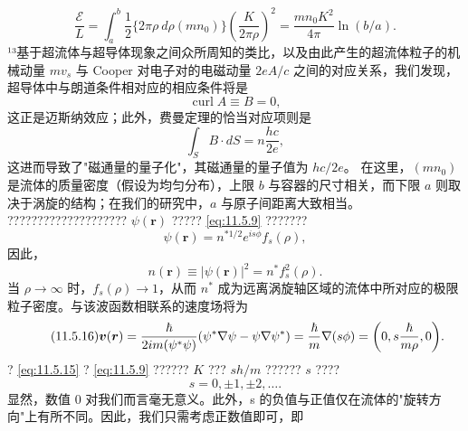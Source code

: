 \begin{equation}\tag{11.5.11}\label{eq:11.5.11}
\frac { \mathcal { E } } { L } = \int _ { a } ^{b} \frac { 1 } { 2 } \{ 2 \pi \rho \ d \rho ( m n _ { 0 } ) \} \left( \frac { K } { 2 \pi \rho } \right) ^{2} = \frac { m n _ { 0 } K ^{2} } { 4 \pi } \ln ( b / a ) .
\end{equation}
¹³基于超流体与超导体现象之间众所周知的类比，以及由此产生的超流体粒子的机械动量 \(mv_{s}\) 与 Cooper 对电子对的电磁动量 \(2eA/c\) 之间的对应关系，我们发现，超导体中与朗道条件相对应的相应条件将是
\begin{equation}\tag{11.5.12}\label{eq:11.5.12}
\operatorname { c u r l } A \equiv B = 0 ,
\end{equation}
这正是迈斯纳效应；此外，费曼定理的恰当对应项则是
\begin{equation}\tag{11.5.13}\label{eq:11.5.13}
\int _ { S } B \cdot d S = n \frac { h c } { 2 e } ,
\end{equation}
这进而导致了"磁通量的量子化"，其磁通量的量子值为 \(hc/2e\)。
在这里，\((mn_{0})\) 是流体的质量密度（假设为均匀分布），上限 \(b\) 与容器的尺寸相关，而下限 \(a\) 则取决于涡旋的结构；在我们的研究中，\(a\) 与原子间距离大致相当。
???????????????????? \(\psi(\mathbf{r})\) ????? \autoref{eq:11.5.9} ???????
\begin{equation}\tag{11.5.14}\label{eq:11.5.14}
\psi \left( \boldsymbol { r } \right) = n ^{* 1 / 2} e ^{i s \phi} f _ { s } ( \rho ) ,
\end{equation}
因此，
\begin{equation}\tag{11.5.15}\label{eq:11.5.15}
n ( \pmb { r } ) \equiv | \psi ( \pmb { r } ) | ^{2} = n ^{*} f _ { s } ^{2} ( \rho ) .
\end{equation}
当 \(\rho \rightarrow \infty\) 时，\(f_{s}(\rho) \rightarrow 1\)，从而 \(n^{*}\) 成为远离涡旋轴区域的流体中所对应的极限粒子密度。与该波函数相联系的速度场将为
\begin{equation}\tag{11.5.16}\label{eq:11.5.16}
\boldsymbol{v}(\boldsymbol{r})=\frac{\hbar}{2im(\psi^{*}\psi)}(\psi^{*}\nabla\psi-\psi\nabla\psi^{*})\\=\frac{\hbar}{m}\nabla(s\phi)=\biggl(0,s\frac{\hbar}{m\rho},0\biggr).
\end{equation}
? \autoref{eq:11.5.15} ? \autoref{eq:11.5.9} ?????? \(K\) ??? \(sh/m\) ?????? \(s\) ????
\begin{equation}\tag{11.5.17}\label{eq:11.5.17}
s = 0 , \pm 1 , \pm 2 , \ldots .
\end{equation}
显然，数值 0 对我们而言毫无意义。此外，s 的负值与正值仅在流体的"旋转方向"上有所不同。因此，我们只需考虑正数值即可，即
